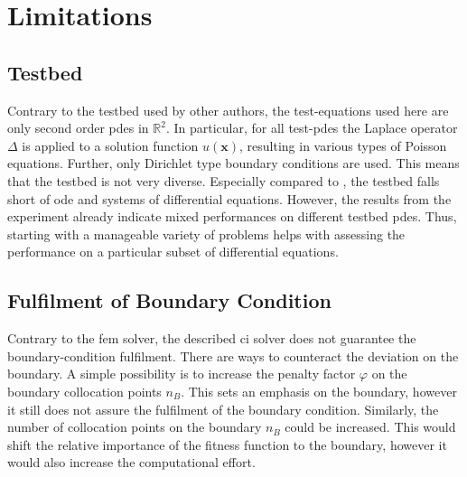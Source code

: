 \documentclass[./\jobname.tex]{subfiles}
\begin{document}
\section{Limitations}
\subsection{Testbed}
Contrary to the testbed used by other authors, the test-equations used here are only second order \gls{pde}s in $\mathbb{R}^2$. In particular, for all test-\gls{pde}s the Laplace operator $\Delta$ is applied to a solution function $u(\mathbf{x})$, resulting in various types of Poisson equations. Further, only Dirichlet type boundary conditions are used. This means that the testbed is not very diverse. Especially compared to \cite{chaquet_using_2019}, the testbed falls short of \gls{ode} and systems of differential equations. However, the results from the experiment already indicate mixed performances on different testbed \gls{pde}s. Thus, starting with a manageable variety of problems helps with assessing the performance on a particular subset of differential equations.  

\subsection{Fulfilment of Boundary Condition}
Contrary to the \gls{fem} solver, the described \gls{ci} solver does not guarantee the boundary-condition fulfilment. There are ways to counteract the deviation on the boundary. A simple possibility is to increase the penalty factor $\varphi$ on the boundary collocation points $n_B$. This sets an emphasis on the boundary, however it still does not assure the fulfilment of the boundary condition. Similarly, the number of collocation points on the boundary $n_B$ could be increased. This would shift the relative importance of the fitness function to the boundary, however it would also increase the computational effort. 
\end{document}

